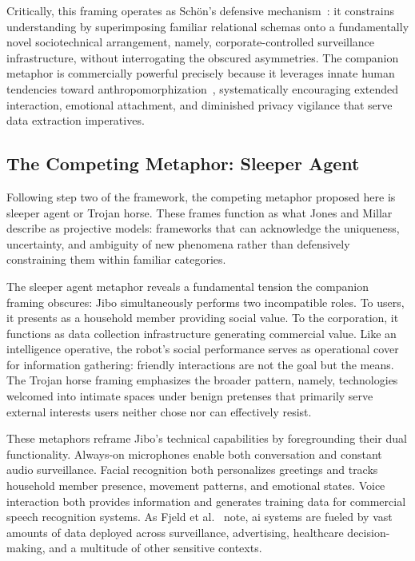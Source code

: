 \documentclass{ieee-portfolio}
\begin{document}
Critically, this framing operates as Sch\"{o}n's defensive mechanism~\cite{schon_generative_1993}: it constrains understanding by superimposing familiar relational schemas onto a fundamentally novel sociotechnical arrangement, namely, corporate-controlled surveillance infrastructure, without interrogating the obscured asymmetries. The companion metaphor is commercially powerful precisely because it leverages innate human tendencies toward anthropomorphization~\cite{darling_whos_2015}, systematically encouraging extended interaction, emotional attachment, and diminished privacy vigilance that serve data extraction imperatives.

\subsection{The Competing Metaphor: Sleeper Agent}

Following step two of the framework, the competing metaphor proposed here is sleeper agent or Trojan horse. These frames function as what Jones and Millar~\cite{jones_hacking_2017} describe as projective models: frameworks that can acknowledge the uniqueness, uncertainty, and ambiguity of new phenomena rather than defensively constraining them within familiar categories.

The sleeper agent metaphor reveals a fundamental tension the companion framing obscures: Jibo simultaneously performs two incompatible roles. To users, it presents as a household member providing social value. To the corporation, it functions as data collection infrastructure generating commercial value. Like an intelligence operative, the robot's social performance serves as operational cover for information gathering: friendly interactions are not the goal but the means. The Trojan horse framing emphasizes the broader pattern, namely, technologies welcomed into intimate spaces under benign pretenses that primarily serve external interests users neither chose nor can effectively resist.

These metaphors reframe Jibo's technical capabilities by foregrounding their dual functionality. Always-on microphones enable both conversation and constant audio surveillance. Facial recognition both personalizes greetings and tracks household member presence, movement patterns, and emotional states. Voice interaction both provides information and generates training data for commercial speech recognition systems. As Fjeld et al.~\cite{fjeld_principled_2020} note, \gls{ai} systems are fueled by vast amounts of data deployed across surveillance, advertising, healthcare decision-making, and a multitude of other sensitive contexts.
\end{document}

